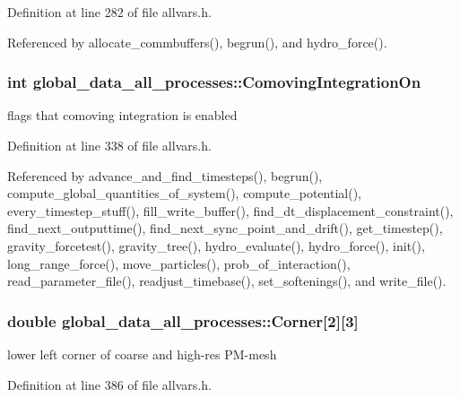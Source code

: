 Definition at line 282 of file allvars.h.



Referenced by allocate\_\-commbuffers(), begrun(), and hydro\_\-force().

\hypertarget{structglobal__data__all__processes_a4104c753df69fb4da0dd9bbb57e2a5f4}{
\subsubsection[{ComovingIntegrationOn}]{\setlength{\rightskip}{0pt plus 5cm}int {\bf global\_\-data\_\-all\_\-processes::ComovingIntegrationOn}}}
\label{structglobal__data__all__processes_a4104c753df69fb4da0dd9bbb57e2a5f4}
flags that comoving integration is enabled 

Definition at line 338 of file allvars.h.



Referenced by advance\_\-and\_\-find\_\-timesteps(), begrun(), compute\_\-global\_\-quantities\_\-of\_\-system(), compute\_\-potential(), every\_\-timestep\_\-stuff(), fill\_\-write\_\-buffer(), find\_\-dt\_\-displacement\_\-constraint(), find\_\-next\_\-outputtime(), find\_\-next\_\-sync\_\-point\_\-and\_\-drift(), get\_\-timestep(), gravity\_\-forcetest(), gravity\_\-tree(), hydro\_\-evaluate(), hydro\_\-force(), init(), long\_\-range\_\-force(), move\_\-particles(), prob\_\-of\_\-interaction(), read\_\-parameter\_\-file(), readjust\_\-timebase(), set\_\-softenings(), and write\_\-file().

\hypertarget{structglobal__data__all__processes_a5ffb63ff788ca6eee831b5d4d0d9e150}{
\subsubsection[{Corner}]{\setlength{\rightskip}{0pt plus 5cm}double {\bf global\_\-data\_\-all\_\-processes::Corner}\mbox{[}2\mbox{]}\mbox{[}3\mbox{]}}}
\label{structglobal__data__all__processes_a5ffb63ff788ca6eee831b5d4d0d9e150}
lower left corner of coarse and high-\/res PM-\/mesh 

Definition at line 386 of file allvars.h.

